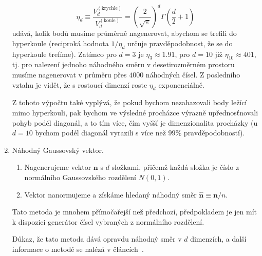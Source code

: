 \documentclass[a4paper,11pt,twoside]{article}
\def\vector#1{\boldsymbol{#1}}								%
\theoremstyle{red}
\theoremstyle{green}
\begin{document}
\begin{solution}
\begin{enumerate}
\begin{equation}
                    \eta_{d}\equiv\frac{V_{d}^{(\text{krychle})}}{V_{d}^{(\text{koule})}}=\left(\frac{2}{\sqrt{\pi}}\right)^{d}\Gamma\left(\frac{d}{2}+1\right)
                \end{equation}
                udává, kolik bodů musíme průměrně nagenerovat, abychom se trefili do hyperkoule (reciproká hodnota $1/\eta_{d}$ určuje pravděpodobnost, že se do hyperkoule trefíme).
                Zatímco pro $d=3$ je $\eta_{3}\approx1.91$, pro $d=10$ již $\eta_{10}\approx401$, tj. pro nalezení jednoho náhodného směru v desetirozměrném prostoru musíme nagenerovat v průměru přes $4000$ náhodných čísel.
                Z posledního vztahu je vidět, že s rostoucí dimenzí roste $\eta_{d}$ exponenciálně.

                Z tohoto výpočtu také vyplývá, že pokud bychom nezahazovali body ležící mimo hyperkouli, pak bychom ve výsledné procházce výrazně upřednosťnovali pohyb podél diagonál, a to tím více, čím vyšší je dimenzionalita procházky (u $d=10$ bychom podél diagonál vyrazili s více než $99\%$ pravděpodobností).
                
            \item Náhodný Gaussovský vektor.
                \begin{enumerate}
                    \item Nagenerujeme vektor $\vector{n}$ s $d$ složkami, přičemž každá složka je číslo z normálního Gaussovského rozdělení $N(0,1)$.
                    \item Vektor nanormujeme a získáme hledaný náhodný směr $\vector{\hat{n}}\equiv\vector{n}/n$. 
                \end{enumerate}
                Tato metoda je mnohem přímočařejší než předchozí, předpokladem je jen mít k dispozici generátor čísel vybraných z normálního rozdělení.

                Důkaz, že tato metoda dává opravdu náhodný směr v $d$ dimenzích, a další informace o metodě se nalézá v článcích~\cite{Muller1959,Marsaglia1972}.


\end{enumerate}
\end{solution}
\end{document}
